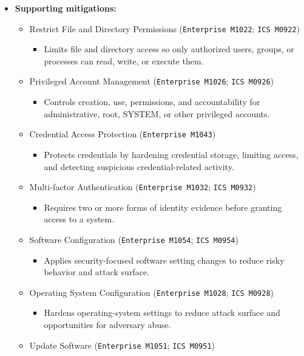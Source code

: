\documentclass[10pt,a4paper,oneside]{report}
\begin{document}
\begin{itemize}
\item \textbf{Supporting mitigations:}
\begin{itemize}
\item Restrict File and Directory Permissions (\texttt{Enterprise M1022}; \texttt{ICS M0922})
\begin{itemize}
\item Limits file and directory access so only authorized users, groups, or processes can read, write, or execute them.
\end{itemize}
\item Privileged Account Management (\texttt{Enterprise M1026}; \texttt{ICS M0926})
\begin{itemize}
\item Controls creation, use, permissions, and accountability for administrative, root, SYSTEM, or other privileged accounts.
\end{itemize}
\item Credential Access Protection (\texttt{Enterprise M1043})
\begin{itemize}
\item Protects credentials by hardening credential storage, limiting access, and detecting suspicious credential-related activity.
\end{itemize}
\item Multi-factor Authentication (\texttt{Enterprise M1032}; \texttt{ICS M0932})
\begin{itemize}
\item Requires two or more forms of identity evidence before granting access to a system.
\end{itemize}
\item Software Configuration (\texttt{Enterprise M1054}; \texttt{ICS M0954})
\begin{itemize}
\item Applies security-focused software setting changes to reduce risky behavior and attack surface.
\end{itemize}
\item Operating System Configuration (\texttt{Enterprise M1028}; \texttt{ICS M0928})
\begin{itemize}
\item Hardens operating-system settings to reduce attack surface and opportunities for adversary abuse.
\end{itemize}
\item Update Software (\texttt{Enterprise M1051}; \texttt{ICS M0951})
\begin{itemize}

\end{itemize}
\end{itemize}
\end{itemize}
\end{document}
